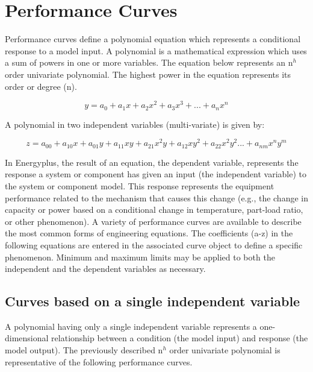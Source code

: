 \section{Performance Curves}\label{performance-curves-000}

Performance curves define a polynomial equation which represents a conditional response to a model input. A polynomial is a mathematical expression which uses a sum of powers in one or more variables. The equation below represents an n\(^{h}\) order univariate polynomial. The highest power in the equation represents its order or degree (n).

\begin{equation}
y = {a_0} + {a_1}x + {a_2}{x^2} + {a_3}{x^3} + ... + {a_n}{x^n}
\end{equation}

A polynomial in two independent variables (multi-variate) is given by:

\begin{equation}
z = {a_{00}} + {a_{10}}x + {a_{01}}y + {a_{11}}xy + {a_{21}}{x^2}y + {a_{12}}x{y^2} + {a_{22}}{x^2}{y^2}... + {a_{nm}}{x^n}{y^m}
\end{equation}

In Energyplus, the result of an equation, the dependent variable, represents the response a system or component has given an input (the independent variable) to the system or component model. This response represents the equipment performance related to the mechanism that causes this change (e.g., the change in capacity or power based on a conditional change in temperature, part-load ratio, or other phenomenon). A variety of performance curves are available to describe the most common forms of engineering equations. The coefficients (a-z) in the following equations are entered in the associated curve object to define a specific phenomenon. Minimum and maximum limits may be applied to both the independent and the dependent variables as necessary.

\subsection{Curves based on a single independent variable}\label{curves-based-on-a-single-independent-variable}

A polynomial having only a single independent variable represents a one-dimensional relationship between a condition (the model input) and response (the model output). The previously described n\(^{h}\) order univariate polynomial is representative of the following performance curves.

